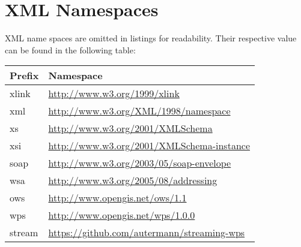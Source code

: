 
\chapter{XML Namespaces}\label{sec:xmlnamespaces}

XML name spaces are omitted in listings for readability. Their respective value can be found in the following table:
\begin{center}
  \begin{small}
    \begin{tabular}{@{}ll@{}}
      \toprule
      \textbf{Prefix} & \textbf{Namespace} \\
      \midrule
      xlink  & \url{http://www.w3.org/1999/xlink}\\
      xml    & \url{http://www.w3.org/XML/1998/namespace}\\
      xs     & \url{http://www.w3.org/2001/XMLSchema}\\
      xsi    & \url{http://www.w3.org/2001/XMLSchema-instance}\\
      soap   & \url{http://www.w3.org/2003/05/soap-envelope}\\
      wsa    & \url{http://www.w3.org/2005/08/addressing}\\
      ows    & \url{http://www.opengis.net/ows/1.1}\\
      wps    & \url{http://www.opengis.net/wps/1.0.0}\\
      stream & \url{https://github.com/autermann/streaming-wps} \\
      \bottomrule
    \end{tabular}
  \end{small}
\end{center}